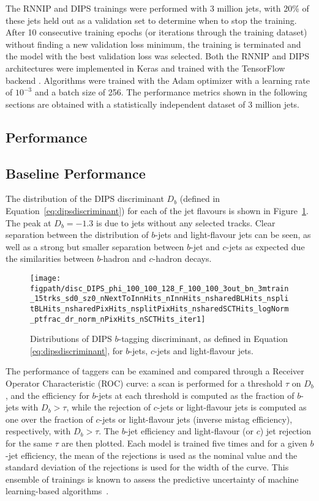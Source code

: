 The RNNIP and DIPS trainings were performed with 3 million jets, with 20\% of these jets held out as a validation set to determine when to stop the training. 
After 10 consecutive training epochs (or iterations through the training dataset) without finding a new validation loss minimum, the training is terminated and the model with the best validation loss was selected.  Both the RNNIP and DIPS architectures were implemented in Keras \cite{chollet2015keras} and trained with the TensorFlow backend \cite{tensorflow2015-whitepaper}. 
Algorithms were trained with the Adam optimizer \cite{kingma2014adam} with a learning rate of $10^{-3}$ and a batch size of 256. 
The performance metrics shown in the following sections are obtained with a statistically independent dataset of 3 million jets.

\subsection{Performance}

\subsection{Baseline Performance}
\label{subsec:baseline}

The distribution of the DIPS discriminant $D_b$ (defined in Equation~\ref{eq:dipsdiscriminant}) for each of the jet flavours is shown in Figure~\ref{fig:Db}. 
The peak at $D_b = -1.3$ is due to jets without any selected tracks. 
Clear separation between the distribution of $b$-jets and light-flavour jets can be seen, as well as a strong but smaller separation between $b$-jet and $c$-jets as expected due the similarities between $b$-hadron and $c$-hadron decays.

\begin{figure}[h!]
  \centering
  \texttt{[image: \\figpath/disc\_DIPS\_phi\_100\_100\_128\_F\_100\_100\_3out\_bn\_3mtrain\_15trks\_sd0\_sz0\_nNextToInnHits\_nInnHits\_nsharedBLHits\_nsplitBLHits\_nsharedPixHits\_nsplitPixHits\_nsharedSCTHits\_logNorm\_ptfrac\_dr\_norm\_nPixHits\_nSCTHits\_iter1]}
  \caption{Distributions of DIPS $b$-tagging discriminant, as defined in Equation \ref{eq:dipsdiscriminant}, for $b$-jets, $c$-jets and light-flavour jets.}
  \label{fig:Db}
\end{figure}

The performance of taggers can be examined and compared through a Receiver Operator Characteristic (ROC) curve: a scan is performed for a threshold $\tau$ on $D_b$, and the efficiency for $b$-jets at each threshold is computed as the fraction of $b$-jets with $D_b > \tau$, while the rejection of $c$-jets or light-flavour jets is computed as one over the fraction of $c$-jets or light-flavour jets (inverse mistag efficiency), respectively, with $D_b > \tau$. 
The $b$-jet efficiency and light-flavour (or $c$) jet rejection for the same $\tau$ are then plotted.  Each model is trained five times and for a given $b$-jet efficiency, the mean of the rejections is used as the nominal value and the standard deviation of the rejections is used for the width of the curve. 
This ensemble of trainings is known to assess the predictive uncertainty of machine learning-based algorithms~\cite{deepensembles}.

